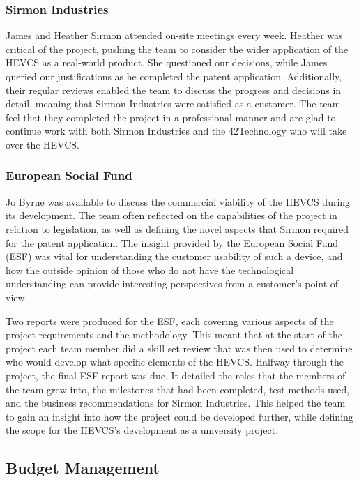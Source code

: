 \documentclass [12pt]{article}
\begin{document}
\subsubsection{Sirmon Industries}
James and Heather Sirmon attended on-site meetings every week. Heather was critical of the project, pushing the team to consider the wider application of the HEVCS as a real-world product. She questioned our decisions, while James queried our justifications as he completed the patent application. Additionally, their regular reviews enabled the team to discuss the progress and decisions in detail, meaning that Sirmon Industries were satisfied as a customer. The team feel that they completed the project in a professional manner and are glad to continue work with both Sirmon Industries and the 42Technology who will take over the HEVCS. 

\subsubsection{European Social Fund}
Jo Byrne was available to discuss the commercial viability of the HEVCS during its development. The team often reflected on the capabilities of the project in relation to legislation, as well as defining the novel aspects that Sirmon required for the patent application. The insight provided by the European Social Fund (ESF) was vital for understanding the customer usability of such a device, and how the outside opinion of those who do not have the technological understanding can provide interesting perspectives from a customer’s point of view.  

Two reports were produced for the ESF, each covering various aspects of the project requirements and the methodology. This meant that at the start of the project each team member did a skill set review that was then used to determine who would develop what specific elements of the HEVCS. Halfway through the project, the final ESF report was due. It detailed the roles that the members of the team grew into, the milestones that had been completed, test methods used, and the business recommendations for Sirmon Industries. This helped the team to gain an insight into how the project could be developed further, while defining the scope for the HEVCS’s development as a university project.  

\subsection{Budget Management}
\end{document}
